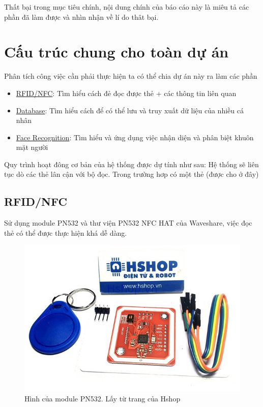 Thất bại trong mục tiêu chính, nội dung chính của báo cáo này là miêu tả
các phần đã làm được và nhìn nhận về lí do thât bại.

\hypertarget{cux1ea5u-truxfac-chung-cho-touxe0n-dux1ef1-uxe1n}{%
\section{Cấu trúc chung cho toàn dự
án}\label{cux1ea5u-truxfac-chung-cho-touxe0n-dux1ef1-uxe1n}}

Phân tích công việc cần phải thực hiện ta có thể chia dự án này ra làm
các phần

\begin{itemize}
\tightlist
\item
  \protect\hyperlink{RFID_NFC}{RFID/NFC}: Tìm hiểu cách đẻ đọc được thẻ
  + các thông tin liên quan
\item
  \protect\hyperlink{Database}{Database}: Tìm hiểu cách để có thể lưu và
  truy xuất dữ liệu của nhiều cá nhân
\item
  \protect\hyperlink{Face_Recog}{Face Recognition}: Tìm hiểu và ứng dụng
  việc nhận diện và phân biệt khuôn mặt người
\end{itemize}

Quy trình hoạt đông cơ bản của hệ thống được dự tính như sau: Hệ thống
sẽ liên tục dò các thẻ lân cận với bộ đọc. Trong trường hơp có một thẻ
(được cho ở đây)

\hypertarget{RFID_NFC}{%
\subsection{RFID/NFC}\label{RFID_NFC}}

Sử dụng module PN532 và thư viện PN532 NFC HAT của Waveshare, việc đọc
thẻ có thể được thực hiện khá dễ dàng.

\begin{figure}
\centering
\includegraphics{PN532_module.jpeg}
\caption{Hình của module PN532. Lấy từ trang của Hshop}
\end{figure}

